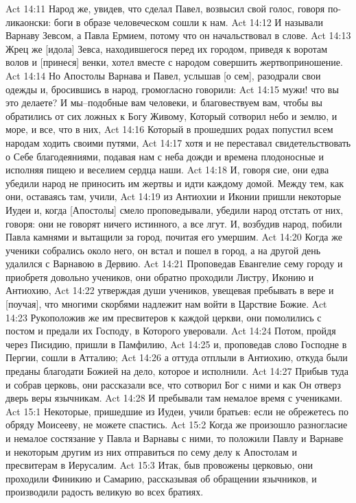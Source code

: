 Act 14:11  Народ же, увидев, что сделал Павел, возвысил свой голос, говоря по-ликаонски: боги в образе человеческом сошли к нам.
Act 14:12  И называли Варнаву Зевсом, а Павла Ермием, потому что он начальствовал в слове.
Act 14:13  Жрец же [идола] Зевса, находившегося перед их городом, приведя к воротам волов и [принеся] венки, хотел вместе с народом совершить жертвоприношение.
Act 14:14  Но Апостолы Варнава и Павел, услышав [о сем], разодрали свои одежды и, бросившись в народ, громогласно говорили:
Act 14:15  мужи! что вы это делаете? И мы--подобные вам человеки, и благовествуем вам, чтобы вы обратились от сих ложных к Богу Живому, Который сотворил небо и землю, и море, и все, что в них,
Act 14:16  Который в прошедших родах попустил всем народам ходить своими путями,
Act 14:17  хотя и не переставал свидетельствовать о Себе благодеяниями, подавая нам с неба дожди и времена плодоносные и исполняя пищею и веселием сердца наши.
Act 14:18  И, говоря сие, они едва убедили народ не приносить им жертвы и идти каждому домой. Между тем, как они, оставаясь там, учили,
Act 14:19  из Антиохии и Иконии пришли некоторые Иудеи и, когда [Апостолы] смело проповедывали, убедили народ отстать от них, говоря: они не говорят ничего истинного, а все лгут. И, возбудив народ, побили Павла камнями и вытащили за город, почитая его умершим.
Act 14:20  Когда же ученики собрались около него, он встал и пошел в город, а на другой день удалился с Варнавою в Дервию.
Act 14:21  Проповедав Евангелие сему городу и приобретя довольно учеников, они обратно проходили Листру, Иконию и Антиохию,
Act 14:22  утверждая души учеников, увещевая пребывать в вере и [поучая], что многими скорбями надлежит нам войти в Царствие Божие.
Act 14:23  Рукоположив же им пресвитеров к каждой церкви, они помолились с постом и предали их Господу, в Которого уверовали.
Act 14:24  Потом, пройдя через Писидию, пришли в Памфилию,
Act 14:25  и, проповедав слово Господне в Пергии, сошли в Атталию;
Act 14:26  а оттуда отплыли в Антиохию, откуда были преданы благодати Божией на дело, которое и исполнили.
Act 14:27  Прибыв туда и собрав церковь, они рассказали все, что сотворил Бог с ними и как Он отверз дверь веры язычникам.
Act 14:28  И пребывали там немалое время с учениками.
Act 15:1  Некоторые, пришедшие из Иудеи, учили братьев: если не обрежетесь по обряду Моисееву, не можете спастись.
Act 15:2  Когда же произошло разногласие и немалое состязание у Павла и Варнавы с ними, то положили Павлу и Варнаве и некоторым другим из них отправиться по сему делу к Апостолам и пресвитерам в Иерусалим.
Act 15:3  Итак, быв провожены церковью, они проходили Финикию и Самарию, рассказывая об обращении язычников, и производили радость великую во всех братиях.
